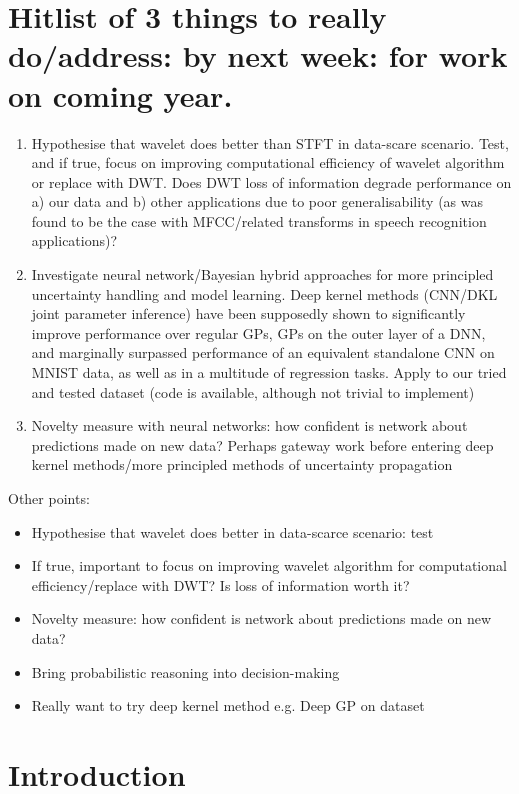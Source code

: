 \documentclass[12pt]{llncs}
\begin{document}
\section{Hitlist of 3 things to really do/address: by next week: for work on coming year.}
\begin{enumerate}
	\item Hypothesise that wavelet does better than STFT in data-scare scenario. Test, and if true, focus on improving computational efficiency of wavelet algorithm or replace with DWT. Does DWT loss of information degrade performance on a) our data and b) other applications due to poor generalisability (as was found to be the case with MFCC/related transforms in speech recognition applications)?
	\item Investigate neural network/Bayesian hybrid approaches for more principled uncertainty handling and model learning. Deep kernel methods (CNN/DKL joint parameter inference) have been supposedly shown to significantly improve performance over regular GPs, GPs on the outer layer of a DNN, and marginally surpassed performance of an equivalent standalone CNN on MNIST data, as well as in a multitude of regression tasks. Apply to our tried and tested dataset (code is available, although not trivial to implement)
	\item Novelty measure with neural networks: how confident is network about predictions made on new data? Perhaps gateway work before entering deep kernel methods/more principled methods of uncertainty propagation

\end{enumerate}
Other points:
\begin{itemize}
	\item Hypothesise that wavelet does better in data-scarce scenario: test
	\item If true, important to focus on improving wavelet algorithm for computational efficiency/replace with DWT? Is loss of information worth it?
	\item Novelty measure: how confident is network about predictions made on new data?
	\item Bring probabilistic reasoning into decision-making
	\item Really want to try deep kernel method e.g. Deep GP on dataset \cite{wilson2016deep}
\end{itemize}



\section{Introduction}
\end{document}
